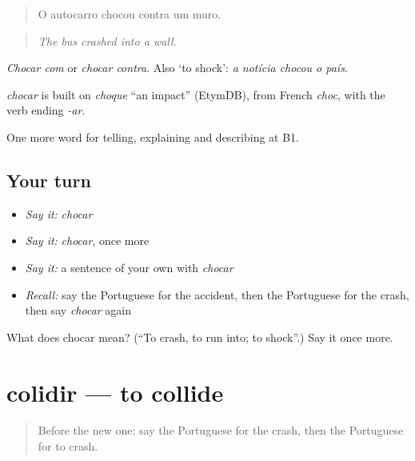 \begin{quote}
O autocarro chocou contra um muro.
\end{quote}

\begin{quote}
\emph{The bus crashed into a wall.}
\end{quote}

\emph{Chocar com} or \emph{chocar contra}. Also ‘to shock’: \emph{a notícia chocou o país}.

\begin{cousinweb}
\emph{chocar} is built on \emph{choque} \textquotedblleft{}an impact\textquotedblright{} (EtymDB), from French \emph{choc}, with the verb ending \emph{-ar}.
\end{cousinweb}

\begin{grammarlens}[title={What you've built}]
One more word for telling, explaining and describing at B1.
\end{grammarlens}

\subsection*{Your turn}
\begin{itemize}
\raggedright
  \item \emph{Say it:} \emph{chocar}
  \item \emph{Say it:} \emph{chocar}, once more
  \item \emph{Say it:} a sentence of your own with \emph{chocar}
  \item \emph{Recall:} say the Portuguese for the accident, then the Portuguese for the crash, then say \emph{chocar} again
\end{itemize}

\begin{tcolorbox}[breakable,colback=teal!4,colframe=teal!35!black,title={Before you move on}]
What does chocar mean? (\textquotedblleft{}To crash, to run into; to shock\textquotedblright{}.) Say it once more.
\end{tcolorbox}
\section[colidir]{colidir — to collide}

\label{lesson:PT-C299-colidir}



\begin{quote}
Before the new one: say the Portuguese for the crash, then the Portuguese for to crash.
\end{quote}

